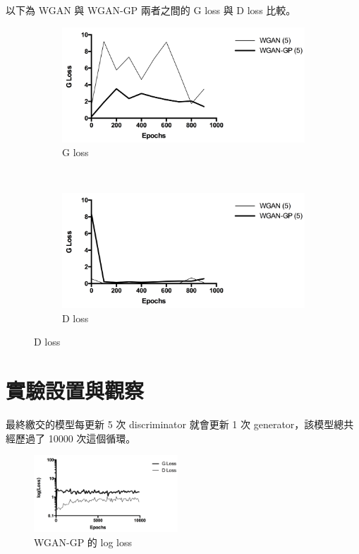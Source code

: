 \documentclass[final,3p]{elsarticle}
\begin{document}
	以下為 WGAN 與 WGAN-GP 兩者之間的 G loss 與 D loss 比較。
	\begin{figure}[H]
		\centering
		\begin{subfigure}{.48\textwidth}
			\centering
			\includegraphics[width=\linewidth]{images/g_loss_wgangp}
			\caption{G loss}
		\end{subfigure}
		~
		\begin{subfigure}{.48\textwidth}
			\centering
			\includegraphics[width=\linewidth]{images/d_loss_wgangp}
			\caption{D loss}
		\end{subfigure}
		\label{fig:dg_gd_loss}
	\end{figure}

\section{實驗設置與觀察}
	最終繳交的模型每更新 5 次 discriminator 就會更新 1 次 generator，該模型總共經歷過了 10000 次這個循環。
	
	\begin{figure}[H]
		\centering
		\includegraphics[width=0.48\textwidth]{images/wgan_gp_loss}
		\caption{WGAN-GP 的 log loss} \label{fig:wgan_gp_loss}
	\end{figure}
	
\end{document}
